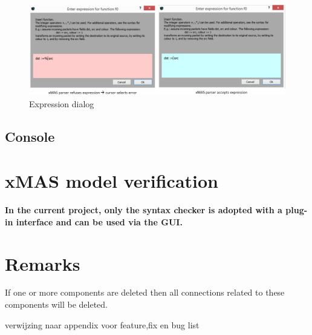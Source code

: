 \begin{figure}[here]
\begin{center}	
	\includegraphics[width=.90\linewidth]{pictures/expression-dialog}
	\caption{Expression dialog}
	\label{fig:expression-dialog}
\end{center}
\end{figure}



\subsection{Console}



\section{xMAS model verification}
\begin{tcolorbox}[colback=white]
\textbf{
In the current project, only the syntax checker is adopted with a plug-in
interface and can be used via the GUI.
}
\end{tcolorbox}



\section{Remarks}


If one or more components are deleted then all connections related to these
components will be deleted.

\begin{tcolorbox}[colback=yellow!30]
 verwijzing naar appendix voor feature,fix en bug list
\end{tcolorbox}




